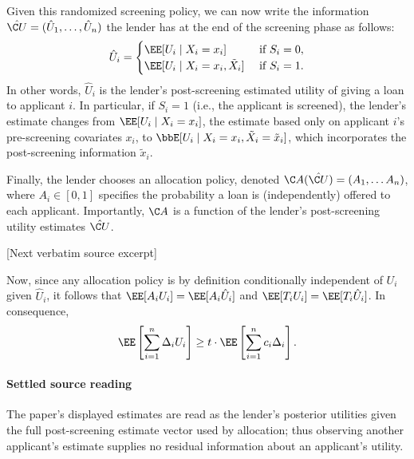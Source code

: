 \documentclass[10pt]{article}
\begin{document}
\begin{ReviewVerbatim}
Given this randomized screening policy, we can now write the information \(\hat {\C U} = (\hat U_1, \ldots, \hat U_n)\) the lender has at the end of the screening phase as follows:
    \begin{equation}
        \hat U_i = \begin{cases}
            \EE[U_i \mid X_i = x_i] & \text{ if } S_i = 0, \\
            \EE[U_i \mid X_i = x_i, \tilde{X}_i] & \text{ if } S_i =1.
        \end{cases}
    \end{equation}
In other words, \(\hat U_i\) is the lender's post-screening estimated utility of giving a loan to applicant \(i\).
In particular, if \(S_i = 1\) (i.e., the applicant is screened), the lender's estimate changes from \(\EE[U_i\mid X_i = x_i]\),
the estimate based only on applicant \(i\)'s pre-screening covariates \(x_i\),
to
\(\bbE[U_i \mid X_i = x_i, \tilde{X}_i = \tilde{x}_i] \), which incorporates the post-screening information \(\tilde{x}_i\).

Finally, the lender chooses an allocation policy, denoted \(\C A(\hat {\C U}) = (A_1, \dots A_n)\),
where \(A_i \in [0,1]\)
specifies the probability a loan is (independently) offered to each applicant.
Importantly, \(\C A\) is a function of
the lender's post-screening utility estimates
\(\hat {\C U}\).

[Next verbatim source excerpt]

Now, since any allocation policy is by definition conditionally independent of \(U_i\) given \(\hat U_i\), it follows that \(\EE [A_i U_i] = \EE [A_i \hat U_i]\) and \(\EE [T_i U_i] = \EE [T_i \hat U_i]\). In consequence,
\begin{equation}
    \label{eq:key}
        \EE \left[ \sum_{i = 1}^n \Delta_i U_i \right] \geq t \cdot \EE \left[ \sum_{i = 1}^n c_i \Delta_i \right].
    \end{equation}
\end{ReviewVerbatim}

\paragraph{Settled source reading}
\begin{sloppypar}
The paper's displayed estimates are read as the lender's posterior utilities given the full post-\allowbreak{}screening estimate vector used by allocation;\allowbreak{} thus observing another applicant's estimate supplies no residual information about an applicant's utility.\allowbreak{}
\end{sloppypar}
\end{document}

